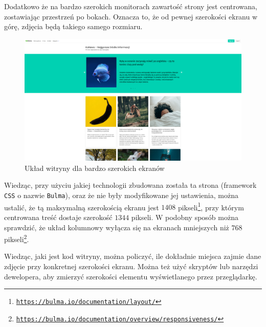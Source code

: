 \documentclass[licencjacka]{pracadypl}
\begin{document}
Dodatkowo że na bardzo szerokich monitorach zawartość strony jest centrowana, zostawiając przestrzeń po bokach. Oznacza to, że od pewnej szerokości ekranu w górę, zdjęcia będą takiego samego rozmiaru. 

\begin{figure}[H]
  \includegraphics[width=\linewidth]{images/screenshot-very-wide.png}
  \caption{Układ witryny dla bardzo szerokich ekranów}
  \label{fig:screenshot-verywide}
\end{figure}

Wiedząc, przy użyciu jakiej technologii zbudowana została ta strona (framework \texttt{CSS} o nazwie \texttt{Bulma}), oraz że nie były modyfikowane jej ustawienia, można ustalić, że tą maksymalną szerokością ekranu jest $1408$ pikseli\footnote{\href{https://web.archive.org/web/20230518134357/https://bulma.io/documentation/layout/}{\texttt{https://bulma.io/documentation/layout/}}}, przy którym centrowana treść dostaje szerokość $1344$ pikseli. W podobny sposób można sprawdzić, że układ kolumnowy wyłącza się na ekranach mniejszych niż $768$ pikseli\footnote{\href{https://web.archive.org/web/20230512141342/https://bulma.io/documentation/overview/responsiveness/}{\texttt{https://bulma.io/documentation/overview/responsiveness/}}}.

Wiedząc, jaki jest kod witryny, można policzyć, ile dokładnie miejsca zajmie dane zdjęcie przy konkretnej szerokości ekranu. Można też użyć skryptów lub narzędzi dewelopera, aby zmierzyć szerokości elementu wyświetlanego przez przeglądarkę.
\end{document}
